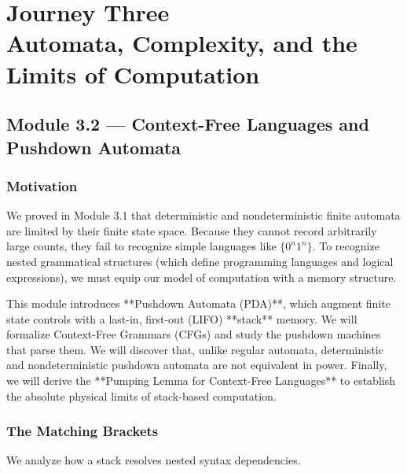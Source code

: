 \documentclass[12pt, a4paper]{book}
\begin{document}
\setcounter{chapter}{2}
\chapter[Journey 3 --- Automata, Complexity, and the Limits of Computation]
        {Journey Three\\[8pt]
         \textcolor{ModuleColor}{\large Automata, Complexity, and the Limits of Computation}}
\setcounter{section}{1}

\section{Module 3.2 --- Context-Free Languages and Pushdown Automata}
\label{sec:mod3.2}

\subsection*{Motivation}

We proved in Module 3.1 that deterministic and nondeterministic finite automata are limited by their finite state space. Because they cannot record arbitrarily large counts, they fail to recognize simple languages like $\{0^n 1^n\}$.
To recognize nested grammatical structures (which define programming languages and logical expressions), we must equip our model of computation with a memory structure.

This module introduces **Pushdown Automata (PDA)**, which augment finite state controls with a last-in, first-out (LIFO) **stack** memory.
We will formalize Context-Free Grammars (CFGs) and study the pushdown machines that parse them.
We will discover that, unlike regular automata, deterministic and nondeterministic pushdown automata are not equivalent in power.
Finally, we will derive the **Pumping Lemma for Context-Free Languages** to establish the absolute physical limits of stack-based computation.

\subsection{The Matching Brackets}

We analyze how a stack resolves nested syntax dependencies.
\end{document}
